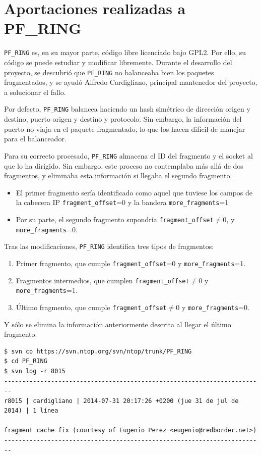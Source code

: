 \section{Aportaciones realizadas a PF\_RING}
\texttt{PF\_RING} es, en su mayor parte, código libre licenciado bajo GPL2. Por ello, su código se puede estudiar y 
modificar libremente. Durante el desarrollo del proyecto, se descubrió que \texttt{PF\_RING} no balanceaba bien los 
paquetes fragmentados, y se ayudó Alfredo Cardigliano, principal mantenedor del proyecto, a solucionar el fallo.

Por defecto, \texttt{PF\_RING} balancea haciendo un hash simétrico de dirección origen y destino, puerto origen y 
destino y protocolo. Sin embargo, la información del puerto no viaja en el paquete fragmentado, lo que los hacen 
difícil de manejar para el balanceador.

Para su correcto procesado, \texttt{PF\_RING} almacena el ID del fragmento y el socket al que lo ha dirigido. Sin 
embargo, este proceso no contemplaba más allá de dos fragmentos, y eliminaba esta información si llegaba el segundo 
fragmento.

\begin{itemize}
 \item El primer fragmento sería identificado como aquel que tuviese los campos de la cabecera IP 
\texttt{fragment\_offset}=0 y la bandera \texttt{more\_fragments}=1
 \item Por su parte, el segundo fragmento supondría \texttt{fragment\_offset}$ 
\neq$0, y \texttt{more\_fragments}=0.
\end{itemize}

Tras las modificaciones, \texttt{PF\_RING} identifica tres tipos de fragmentos:
\begin{enumerate}
 \item Primer fragmento, que cumple \texttt{fragment\_offset}=0 y \texttt{more\_fragments}=1.
 \item Fragmentos intermedios, que cumplen \texttt{fragment\_offset}$\neq$0 y \texttt{more\_fragments}=1.
 \item Último fragmento, que cumple \texttt{fragment\_offset}$\neq$0 y \texttt{more\_fragments}=0.
\end{enumerate}

Y sólo se elimina la información anteriormente descrita al llegar el último fragmento.

\begin{verbatim}
$ svn co https://svn.ntop.org/svn/ntop/trunk/PF_RING
$ cd PF_RING
$ svn log -r 8015
------------------------------------------------------------------------
r8015 | cardigliano | 2014-07-31 20:17:26 +0200 (jue 31 de jul de 2014) | 1 línea

fragment cache fix (courtesy of Eugenio Perez <eugenio@redborder.net>)
------------------------------------------------------------------------
\end{verbatim}


